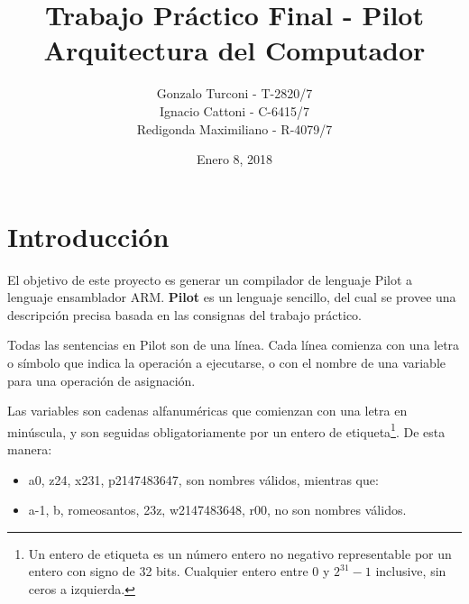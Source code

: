 \documentclass[12pt,spanish]{article}
\begin{document}
 
 
\title{Trabajo Práctico Final - Pilot \\
 \large Arquitectura del Computador
}
\date{Enero 8, 2018}
\author{Gonzalo Turconi - T-2820/7 \\
        Ignacio Cattoni - C-6415/7 \\
        Redigonda Maximiliano - R-4079/7}
\maketitle

\section{Introducción}
El objetivo de este proyecto es generar un compilador de lenguaje Pilot a lenguaje ensamblador ARM. \textbf{Pilot} es un lenguaje sencillo, del cual se provee una descripción precisa basada en las consignas del trabajo práctico.

Todas las sentencias en Pilot son de una línea. Cada línea comienza con una letra o símbolo que indica la operación a ejecutarse, o con el nombre de una variable para una operación de asignación.

Las variables son cadenas alfanuméricas que comienzan con una letra en minúscula, y son seguidas obligatoriamente por un entero de etiqueta\footnote{Un entero de etiqueta es un número entero no negativo representable por un entero con signo de 32 bits. Cualquier entero entre $0$ y $2^{31}-1$ inclusive, sin ceros a izquierda.}. De esta manera:
\begin{itemize}
\item{a0, z24, x231, p2147483647, son nombres válidos, mientras que:}
\item{a-1, b, romeosantos, 23z, w2147483648, r00, no son nombres válidos.}
\end{itemize}
\end{document}
